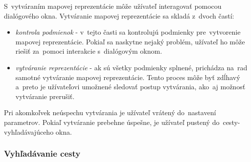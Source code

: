 \documentclass[12pt,a4paper]{report}
\begin{document}
S~vytváraním mapovej reprezentácie môže užívateľ interagovať pomocou dialógového okna. Vytváranie mapovej reprezentácie sa skladá z~dvoch častí:
\begin{itemize}
    \item \textit{kontrola podmienok} - v~tejto časti sa kontrolujú podmienky pre~vytvorenie mapovej reprezentácie. Pokiaľ sa naskytne nejaký problém, užívateľ ho môže riešiť za~pomoci interakcie s~dialógovým oknom.
    \item \textit{vytváranie reprezentácie} - ak sú všetky podmienky splnené, prichádza na~rad samotné vytváranie mapovej reprezentácie. Tento proces môže byť zdĺhavý a~preto je užívateľovi umožnené sledovať postup vytvárania, ako~aj možnosť vytváranie prerušiť.
\end{itemize}

Pri akomkoľvek neúspechu vytvárania je užívateľ vrátený do~nastavení parametrov. Pokiaľ vytváranie prebehne úspešne, je užívateľ pustený do~cesty-vyhľadávajúceho okna.

\subsubsection{Vyhľadávanie cesty}

\begin{figure}[h]\centering
{}
\end{figure}
\end{document}

